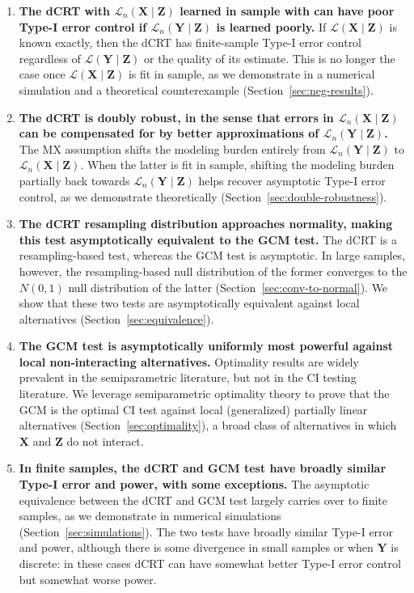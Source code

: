 \documentclass[aos]{imsart}
\theoremstyle{plain}
\theoremstyle{remark}
\newcommand{\prx}{\bm X}								%
\newcommand{\prz}{\bm Z}								%
\newcommand{\pry}{{\bm Y}}								%
\newcommand{\law}{\mathcal L}							%
\begin{document}
\begin{enumerate}
	\item \textbf{The dCRT with $\law_n(\prx \mid \prz)$ learned in sample with can have poor Type-I error control if $\law_n(\pry \mid \prz)$ is learned poorly.} If $\law(\prx \mid \prz)$ is known exactly, then the dCRT has finite-sample Type-I error control regardless of $\law(\pry \mid \prz)$ or the quality of its estimate. This is no longer the case once $\law(\prx \mid \prz)$ is fit in sample, as we demonstrate in a numerical simulation and a theoretical counterexample (Section~\ref{sec:neg-results}).
	\item \textbf{The dCRT is doubly robust, in the sense that errors in $\law_n(\prx \mid \prz)$ can be compensated for by better approximations of $\law_n(\pry \mid \prz)$.} The MX assumption shifts the modeling burden entirely from $\law_n(\pry \mid \prz)$ to $\law_n(\prx \mid \prz)$. When the latter is fit in sample, shifting the modeling burden partially back towards $\law_n(\pry \mid \prz)$ helps recover asymptotic Type-I error control, as we demonstrate theoretically (Section~\ref{sec:double-robustness}).
	\item \textbf{The dCRT resampling distribution approaches normality, making this test asymptotically equivalent to the GCM test.} The dCRT is a resampling-based test, whereas the GCM test is asymptotic. In large samples, however, the resampling-based null distribution of the former converges to the $N(0,1)$ null distribution of the latter (Section~\ref{sec:conv-to-normal}). We show that these two tests are asymptotically equivalent against local alternatives (Section~\ref{sec:equivalence}).
	\item \textbf{The GCM test is asymptotically uniformly most powerful against local non-interacting alternatives.} Optimality results are widely prevalent in the semiparametric literature, but not in the CI testing literature. We leverage semiparametric optimality theory to prove that the GCM is the optimal CI test against  local (generalized) partially linear alternatives (Section~\ref{sec:optimality}), a broad class of alternatives in which $\prx$ and $\prz$ do not interact.
	\item \textbf{In finite samples, the dCRT and GCM test have broadly similar Type-I error and power, with some exceptions.} The asymptotic equivalence between the dCRT and GCM test largely carries over to finite samples, as we demonstrate in numerical simulations (Section~\ref{sec:simulations}). The two tests have broadly similar Type-I error and power, although there is some divergence in small samples or when $\pry$ is discrete: in these cases dCRT can have somewhat better Type-I error control but somewhat worse power. 

\end{enumerate}
\end{document}
